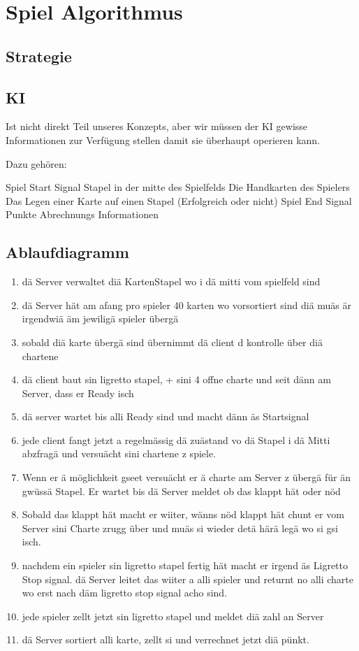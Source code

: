 \section{Spiel Algorithmus} 

\subsection{Strategie}

\subsection{KI}

Ist nicht direkt Teil unseres Konzepts, aber wir müssen der KI gewisse Informationen zur Verfügung stellen damit sie überhaupt operieren kann.

Dazu gehören:

Spiel Start Signal
Stapel in der mitte des Spielfelds
Die Handkarten des Spielers
Das Legen einer Karte auf einen Stapel (Erfolgreich oder nicht)
Spiel End Signal
Punkte Abrechnungs Informationen

\subsection{Ablaufdiagramm}

\begin{enumerate}
	\item dä Server verwaltet diä KartenStapel wo i dä mitti vom spielfeld sind
	\item dä Server hät am afang pro spieler 40 karten wo vorsortiert sind diä muäs är irgendwiä äm jewiligä spieler übergä
	\item sobald diä karte übergä sind übernimmt dä client d kontrolle über diä chartene
	\item dä client baut sin ligretto stapel, + sini 4 offne charte und seit dänn am Server, dass er Ready isch
	\item dä server wartet bis alli Ready sind und macht dänn äs Startsignal
	\item jede client fangt jetzt a regelmässig dä zuästand vo dä Stapel i dä Mitti abzfragä und versuächt sini chartene z spiele.
	\item Wenn er ä möglichkeit gseet versuächt er ä charte am Server z übergä für än gwüssä Stapel. Er wartet bis dä Server meldet ob das klappt hät oder nöd
	\item Sobald das klappt hät macht er wiiter, wänns nöd klappt hät chunt er vom Server sini Charte zrugg über und muäs si wieder detä härä legä wo si gsi isch.
	\item nachdem ein spieler sin ligretto stapel fertig hät macht er irgend äs Ligretto Stop signal. dä Server leitet das wiiter a alli spieler und returnt no alli charte wo erst nach däm ligretto stop signal acho sind.
	\item jede spieler zellt jetzt sin ligretto stapel und meldet diä zahl an Server
	\item dä Server sortiert alli karte, zellt si und verrechnet jetzt diä pünkt.
\end{enumerate}

